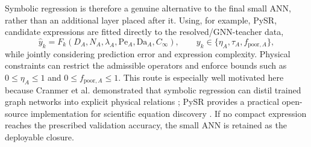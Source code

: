 \documentclass[11pt,a4paper]{article}
\newcommand{\Pe}{\mathrm{Pe}}
\newcommand{\Da}{\mathrm{Da}}
\begin{document}
Symbolic regression is therefore a genuine alternative to the final small
ANN, rather than an additional layer placed after it. Using, for example,
PySR, candidate expressions are fitted directly to the resolved/GNN-teacher
data,
\begin{equation}
  \widehat{y}_k=
  F_k(D_A,N_A,\lambda_A,\Pe_A,\Da_A,C_\infty),
  \qquad
  y_k\in\{\eta_A,\tau_A,f_{\mathrm{poor},A}\},
  \label{eq:symbolic_student}
\end{equation}
while jointly considering prediction error and expression complexity. Physical
constraints can restrict the admissible operators and enforce bounds such as
\(0\leq\eta_A\leq1\) and \(0\leq f_{\mathrm{poor},A}\leq1\). This route is
especially well motivated here because Cranmer et al. demonstrated that
symbolic regression can distil trained graph networks into explicit physical
relations \cite{Cranmer2020}; PySR provides a practical open-source
implementation for scientific equation discovery \cite{Cranmer2023}. If no
compact expression reaches the prescribed validation accuracy, the small ANN
is retained as the deployable closure.
\end{document}
